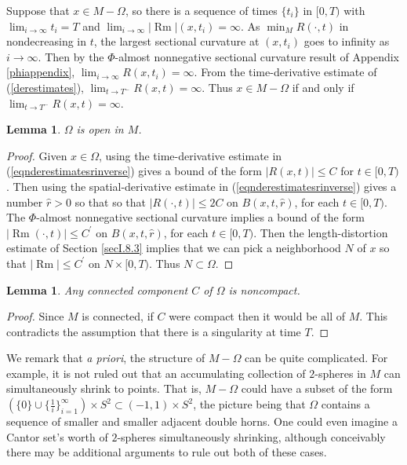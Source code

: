 \documentclass[12pt]{amsart}
\newcommand{\Rm}{\operatorname{Rm}}
\numberwithin{equation}{section}
\theoremstyle{plain}
\newtheorem{lemma}[equation]{Lemma}
\theoremstyle{definition}
\theoremstyle{remark}
\begin{document}
Suppose that $x \in M - \Omega$, so there is a sequence of times $\{t_i\}$ in $[0,T)$ with
$\lim_{i \rightarrow \infty} t_i =T$  and
$\lim_{i \rightarrow \infty} |\Rm|(x,t_i) = \infty$. As $\min_M R(\cdot, t)$ in 
nondecreasing in $t$, the largest sectional curvature at $(x, t_i)$ 
goes to infinity as $i \rightarrow \infty$. Then by the $\Phi$-almost nonnegative sectional 
curvature result of Appendix \ref{phiappendix}, $\lim_{i \rightarrow \infty} R(x, t_i) = \infty$.
From the time-derivative estimate of (\ref{derestimates}), $\lim_{t \rightarrow T^-}
R(x,t) = \infty$. Thus $x \in M-\Omega$ if and only if $\lim_{t \rightarrow T^-}
R(x,t) = \infty$.

\begin{lemma} \label{omegaopen}
$\Omega$ is open in $M$. 
\end{lemma}
\begin{proof}
Given $x \in \Omega$, using the time-derivative estimate in
(\ref{eqnderestimatesrinverse})
gives a bound of the form $|R(x,t)| \le C$ for $t \in [0,T)$.
Then using the spatial-derivative estimate in 
(\ref{eqnderestimatesrinverse}) gives
a number $\widehat{r} > 0$ so that
so that $|R(\cdot,t)| \le 2C$ on $B(x,t,\widehat{r})$, for each
$t \in [0, T)$.
The $\Phi$-almost nonnegative sectional 
curvature implies a bound of the form $|\Rm(\cdot,t)| \le C^\prime$ on
$B(x,t,\widehat{r})$, for each
$t \in [0, T)$. 
Then the length-distortion estimate of Section \ref{secI.8.3}
implies that we can pick a neighborhood $N$ of $x$ so that
$|\Rm| \le C^\prime$ on $N \times [0,T)$.
Thus $N \subset \Omega$.
\end{proof}


\begin{lemma} \label{omeganoncompact}
Any connected component $C$ of $\Omega$ is noncompact.
\end{lemma}
\begin{proof}
Since $M$ is connected, if $C$ were
compact then it would  be all of $M$.  This contradicts the assumption that
there is a singularity at time $T$. 
\end{proof}

We remark that {\it a priori}, the structure of $M - \Omega$ can be quite
complicated.  For example, it is not ruled out that an accumulating
collection of
$2$-spheres in $M$ can simultaneously shrink to points. 
That is, $M - \Omega$ could have
a subset of the form $(\{ 0 \} \cup \{\frac{1}{i}\}_{i=1}^\infty )
\times S^2 \subset (-1, 1) \times S^2$, the picture being that
$\Omega$ contains a sequence of smaller and smaller adjacent double horns. 
One could even imagine a
Cantor set's worth of $2$-spheres simultaneously shrinking, although conceivably
there may be additional arguments to rule out both of these cases.
\end{document}
